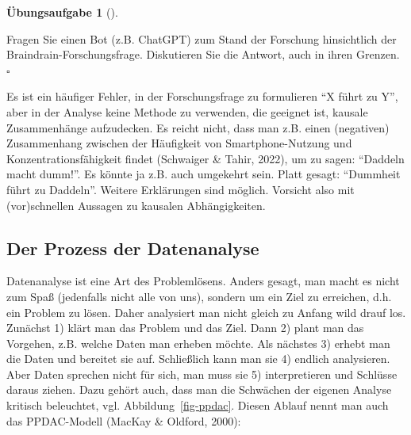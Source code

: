 \documentclass[
  letterpaper,
]{scrbook}
\theoremstyle{definition}
\newtheorem{exercise}{Übungsaufgabe}[chapter]
\theoremstyle{definition}
\theoremstyle{definition}
\theoremstyle{remark}
\begin{document}
\begin{exercise}[]\protect\hypertarget{exr-braindrain-chatgpt}{}\label{exr-braindrain-chatgpt}

Fragen Sie einen Bot (z.B. ChatGPT) zum Stand der Forschung hinsichtlich
der Braindrain-Forschungsfrage. Diskutieren Sie die Antwort, auch in
ihren Grenzen. \(\square\)

\end{exercise}

\begin{tcolorbox}[enhanced jigsaw, colbacktitle=quarto-callout-caution-color!10!white, toptitle=1mm, colframe=quarto-callout-caution-color-frame, breakable, toprule=.15mm, bottomrule=.15mm, bottomtitle=1mm, left=2mm, opacitybacktitle=0.6, colback=white, arc=.35mm, coltitle=black, title=\textcolor{quarto-callout-caution-color}{\faFire}\hspace{0.5em}{Vorsicht}, opacityback=0, rightrule=.15mm, leftrule=.75mm, titlerule=0mm]

Es ist ein häufiger Fehler, in der Forschungsfrage zu formulieren
\enquote{X führt zu Y}, aber in der Analyse keine Methode zu verwenden,
die geeignet ist, kausale Zusammenhänge aufzudecken. Es reicht nicht,
dass man z.B. einen (negativen) Zusammenhang zwischen der Häufigkeit von
Smartphone-Nutzung und Konzentrationsfähigkeit findet (Schwaiger \&
Tahir, 2022), um zu sagen: \enquote{Daddeln macht dumm!}. Es könnte ja
z.B. auch umgekehrt sein. Platt gesagt: \enquote{Dummheit führt zu
Daddeln}. Weitere Erklärungen sind möglich. Vorsicht also mit
(vor)schnellen Aussagen zu kausalen Abhängigkeiten.

\end{tcolorbox}

\subsection{Der Prozess der
Datenanalyse}\label{der-prozess-der-datenanalyse}

Datenanalyse ist eine Art des Problemlösens. Anders gesagt, man macht es
nicht zum Spaß (jedenfalls nicht alle von uns), sondern um ein Ziel zu
erreichen, d.h. ein Problem zu lösen. Daher analysiert man nicht gleich
zu Anfang wild drauf los. Zunächst 1) klärt man das Problem und das
Ziel. Dann 2) plant man das Vorgehen, z.B. welche Daten man erheben
möchte. Als nächstes 3) erhebt man die Daten und bereitet sie auf.
Schließlich kann man sie 4) endlich analysieren. Aber Daten sprechen
nicht für sich, man muss sie 5) interpretieren und Schlüsse daraus
ziehen. Dazu gehört auch, dass man die Schwächen der eigenen Analyse
kritisch beleuchtet, vgl. Abbildung~\ref{fig-ppdac}. Diesen Ablauf nennt
man auch das PPDAC-Modell (MacKay \& Oldford, 2000):
\end{document}
